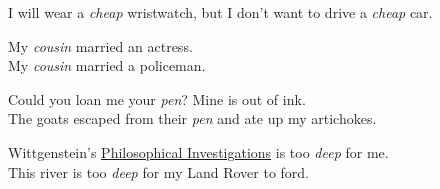 {\ea I will wear a \textit{cheap} wristwatch, but I don’t want to drive a \textit{cheap} car.
\z

\ea\ea My \textit{cousin} married an actress.\\
\ex My \textit{cousin} married a policeman.
\z\z

\ea\ea Could you loan me your \textit{pen}? Mine is out of ink.\\
\ex The goats escaped from their \textit{pen} and ate up my artichokes.
\z\z


\ea\ea Wittgenstein’s \href{http://en.wikipedia.org/wiki/Philosophical_Investigations}{Philosophical Investigations} is too \textit{deep} for me.\\
\ex This river is too \textit{deep} for my Land Rover to ford.
\z\z
}

